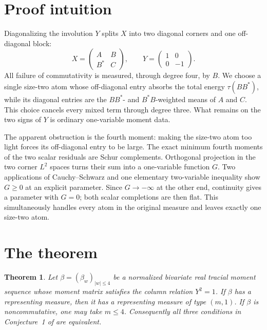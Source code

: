 \documentclass[11pt]{article}
\newtheorem{theorem}{Theorem}
\begin{document}
\section{Proof intuition}

Diagonalizing the involution $Y$ splits $X$ into two diagonal corners and
one off-diagonal block:
\[
 X=\begin{pmatrix}A&B\\B^*&C\end{pmatrix},
 \qquad Y=\begin{pmatrix}1&0\\0&-1\end{pmatrix}.
\]
All failure of commutativity is measured, through degree four, by $B$.
We choose a single size-two atom whose off-diagonal entry absorbs the total
energy $\tau(BB^*)$, while its diagonal entries are the $BB^*$- and
$B^*B$-weighted means of $A$ and $C$.  This choice cancels every mixed term
through degree three.  What remains on the two signs of $Y$ is ordinary
one-variable moment data.

The apparent obstruction is the fourth moment: making the size-two atom too
light forces its off-diagonal entry to be large.  The exact minimum fourth
moments of the two scalar residuals are Schur complements.  Orthogonal
projection in the two corner $L^2$ spaces turns their sum into a one-variable
function $G$.  Two applications of Cauchy--Schwarz and one elementary
two-variable inequality show $G\geq0$ at an explicit parameter.  Since
$G\to-\infty$ at the other end, continuity gives a parameter with $G=0$;
both scalar completions are then flat.  This simultaneously handles every
atom in the original measure and leaves exactly one size-two atom.

\section{The theorem}

\begin{theorem}\label{thm:main}
Let $\beta=(\beta_w)_{|w|\leq4}$ be a normalized bivariate real tracial
moment sequence whose moment matrix satisfies the column relation $Y^2=1$.
If $\beta$ has a representing measure, then it has a representing measure of
type $(m,1)$.  If $\beta$ is noncommutative, one may take $m\leq4$.
Consequently all three conditions in Conjecture~1 of \cite{BZ} are
equivalent.
\end{theorem}
\end{document}
